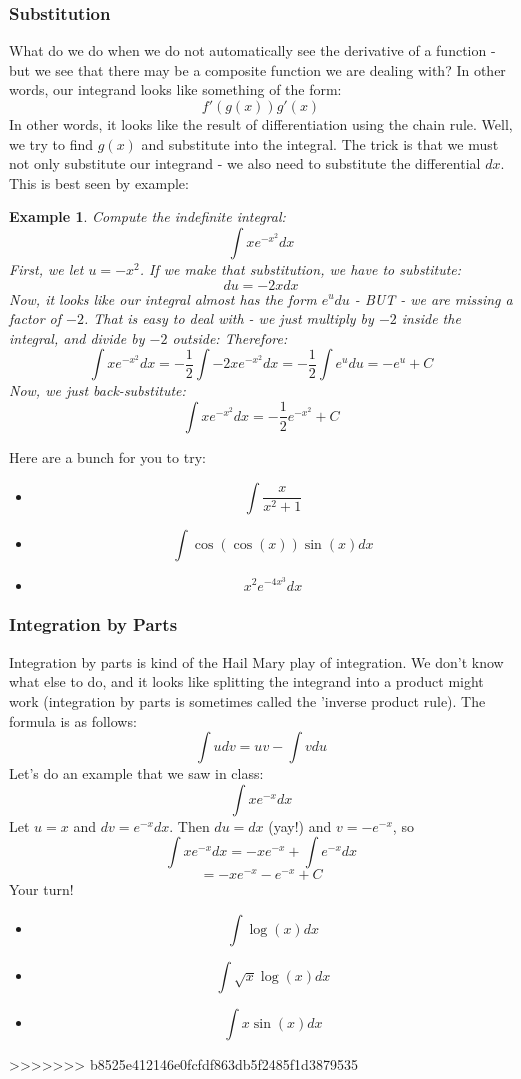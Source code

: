\documentclass[12pt,a4paper]{article} %
\newtheorem{example}{Example}
\begin{document}
\subsubsection{Substitution}
What do we do when we do not automatically see the derivative of a function - but we see that there may be a composite function we are dealing with? In other words, our integrand looks like something of the form:
$$f'(g(x))g'(x)$$
In other words, it looks like the result of differentiation using the chain rule. Well, we try to find $g(x)$ and substitute into the integral. The trick is that we must not only substitute our integrand - we also need to substitute the differential $dx$. This is best seen by example:
\begin{example}
Compute the indefinite integral:
$$\int x e^{-x^2} dx$$
First, we let $u=-x^2$. If we make that substitution, we have to substitute:
$$du = -2x dx$$ 
Now, it looks like our integral \emph{almost} has the form $e^{u} du$ - BUT - we are missing a factor of $-2$. That is easy to deal with - we just multiply by $-2$ inside the integral, and divide by $-2$ outside: 
Therefore:
$$\int x e^{-x^2} dx = -\frac12 \int -2x e^{-x^2}dx = -\frac12\int e^u du = -e^u + C$$
Now, we just back-substitute:
$$\int x e^{-x^2} dx = -\frac12e^{-x^2} + C$$
\end{example}
Here are a bunch for you to try:
\begin{itemize}
\item $$\int \frac{x}{x^2+1}$$
\item $$\int \cos(\cos(x))\sin(x)dx$$
\item $$x^2 e^{-4x^3}dx$$
\end{itemize}
\subsubsection{Integration by Parts}
Integration by parts is kind of the Hail Mary play of integration. We don't know what else to do, and it looks like splitting the integrand into a product might work (integration by parts is sometimes called the 'inverse product rule). The formula is as follows:
$$\int u dv = uv - \int v du$$
Let's do an example that we saw in class:
$$\int x e^{-x} dx$$
Let $u = x$ and $dv = e^{-x} dx$. Then $du = dx$ (yay!) and $v=-e^{-x}$, so
$$\int x e^{-x} dx = -xe^{-x} + \int e^{-x} dx$$
$$= -xe^{-x} - e^{-x} + C$$
Your turn!
\begin{itemize}
\item $$\int\log(x) dx$$
\item $$\int \sqrt{x} \log(x) dx$$
\item $$\int x \sin(x) dx$$
\end{itemize}
>>>>>>> b8525e412146e0fcfdf863db5f2485f1d3879535
\end{document}
